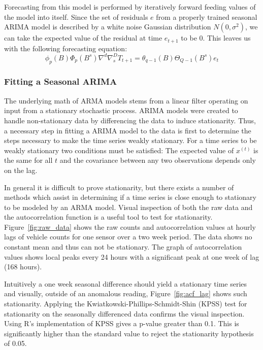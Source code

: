 Forecasting from this model is performed by iteratively forward feeding values of the model into itself.  Since the set of residuals $e$ from a properly trained seasonal ARIMA model is described by a white noise Gaussian distribution $N(0, \sigma^{2})$, we can take the expected value of the residual at time $e_{t + 1}$ to be 0.  This leaves us with the following forecasting equation: 
\begin{equation}
\label{eq:sarima}
\phi_{p}(B)\Phi_{p}(B^{s})\nabla^{d}\nabla^{D}_{s}T_{t + 1} = \theta_{q - 1}(B)\Theta_{Q - 1}(B^{s})e_{t}
\end{equation}

\subsubsection{Fitting a Seasonal ARIMA}
The underlying math of ARMA models stems from a linear filter operating on input from a stationary stochastic process.  ARIMA models were created to handle non-stationary data by differencing the data to induce stationarity.  Thus, a necessary step in fitting a ARIMA model to the data is first to determine the steps necessary to make the time series weakly stationary.  For a time series to be weakly stationary two conditions must be satisfied: The expected value of $x^{(t)}$ is the same for all $t$ and the covariance between any two observations depends only on the lag.  

In general it is difficult to prove stationarity, but there exists a number of methods which assist in determining if a time series is close enough to stationary to be modeled by an ARMA model.  Visual inspection of both the raw data and the autocorrelation function is a useful tool to test for stationarity.  Figure~\ref{fig:raw_data} shows the raw counts and autocorrelation values at hourly lags of vehicle counts for one sensor over a two week period.  The data shows no constant mean and thus can not be stationary.  The graph of autocorrelation values shows local peaks every 24 hours with a significant peak at one week of lag (168 hours).

Intuitively a one week seasonal difference should yield a stationary time series and visually, outside of an anomalous reading, Figure~\ref{fig:acf_lag} shows such stationarity.  Applying the Kwiatkowski-Phillips-Schmidt-Shin (KPSS) \cite{Kwiatkowski1992} test for stationarity on the seasonally differenced data confirms the visual inspection.  Using R's implementation of KPSS gives a p-value greater than 0.1.  This is significantly higher than the standard value to reject the stationarity hypothesis of 0.05.  

